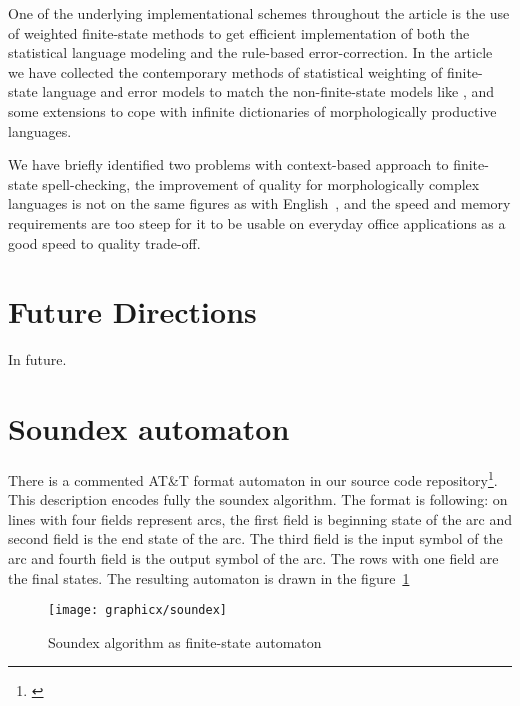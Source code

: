 \documentclass[a4paper,12pt]{article}
\begin{document}
One of the underlying implementational schemes throughout the article is the
use of weighted finite-state methods to get efficient implementation of both
the statistical language modeling and the rule-based error-correction. In the
article we have collected the contemporary methods of statistical weighting
of finite-state language and error models to match the non-finite-state models
like \cite{church1990,}, and some extensions to cope with infinite dictionaries
of morphologically productive languages.

We have briefly identified two problems with context-based approach to
finite-state spell-checking, the improvement of quality for morphologically
complex languages is not on the same figures as with
English~\cite{wilcoxohearn}, and the speed and memory requirements are too
steep for it to be usable on everyday office applications as a good speed to
quality trade-off.

\section{Future Directions}
\label{sec:future}

In future.



\section*{Soundex automaton}
\label{appendix:soundex}

There is a commented AT\&T format automaton in our source code
repository\footnote{\url{}}. This description encodes fully the soundex
algorithm.  The format is following: on lines with four fields represent arcs,
the first field is beginning state of the arc and second field is the end state
of the arc. The third field is the input symbol of the arc and fourth field is
the output symbol of the arc. The rows with one field are the final states. The
resulting automaton is drawn in the figure~\ref{fig:soundex}

\begin{figure}
    \centering
    \texttt{[image: graphicx/soundex]}
    \caption{Soundex algorithm as finite-state automaton
    \label{fig:soundex}}
\end{figure}
\end{document}
